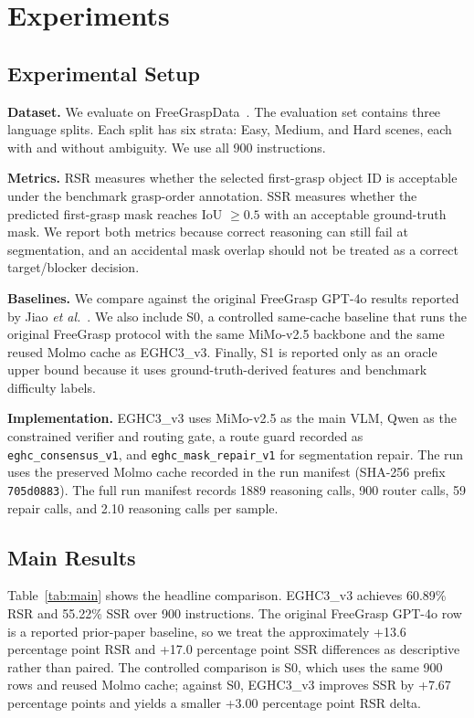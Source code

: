 \section{Experiments}

\subsection{Experimental Setup}

\textbf{Dataset.} We evaluate on FreeGraspData~\cite{freegrasp}. The evaluation set contains three language splits. Each split has six strata: Easy, Medium, and Hard scenes, each with and without ambiguity. We use all 900 instructions.

\textbf{Metrics.} RSR measures whether the selected first-grasp object ID is acceptable under the benchmark grasp-order annotation. SSR measures whether the predicted first-grasp mask reaches IoU $\geq 0.5$ with an acceptable ground-truth mask. We report both metrics because correct reasoning can still fail at segmentation, and an accidental mask overlap should not be treated as a correct target/blocker decision.

\textbf{Baselines.} We compare against the original FreeGrasp GPT-4o results reported by Jiao \emph{et al.}~\cite{freegrasp}. We also include S0, a controlled same-cache baseline that runs the original FreeGrasp protocol with the same MiMo-v2.5 backbone and the same reused Molmo cache as EGHC3\_v3. Finally, S1 is reported only as an oracle upper bound because it uses ground-truth-derived features and benchmark difficulty labels.

\textbf{Implementation.} EGHC3\_v3 uses MiMo-v2.5 as the main VLM, Qwen as the constrained verifier and routing gate, a route guard recorded as \texttt{eghc\_consensus\_v1}, and \texttt{eghc\_mask\_repair\_v1} for segmentation repair. The run uses the preserved Molmo cache recorded in the run manifest (SHA-256 prefix \texttt{705d0883}). The full run manifest records 1889 reasoning calls, 900 router calls, 59 repair calls, and 2.10 reasoning calls per sample.

\subsection{Main Results}

Table~\ref{tab:main} shows the headline comparison. EGHC3\_v3 achieves 60.89\% RSR and 55.22\% SSR over 900 instructions. The original FreeGrasp GPT-4o row is a reported prior-paper baseline, so we treat the approximately +13.6 percentage point RSR and +17.0 percentage point SSR differences as descriptive rather than paired. The controlled comparison is S0, which uses the same 900 rows and reused Molmo cache; against S0, EGHC3\_v3 improves SSR by +7.67 percentage points and yields a smaller +3.00 percentage point RSR delta.


